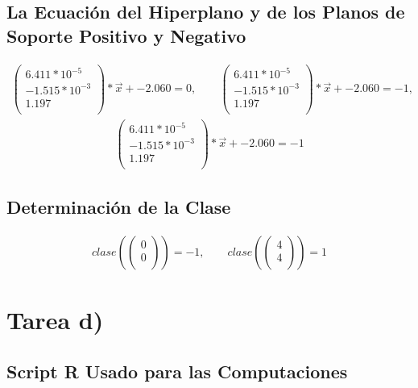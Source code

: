 \documentclass[fleqn]{llncs}
\begin{document}
\subsection{La Ecuación del Hiperplano y de los Planos de Soporte Positivo y Negativo}
\begin{align*}
	\begin{pmatrix}
		6.411*10^{-5} \\
		-1.515*10^{-3} \\
		1.197 \\
	\end{pmatrix} * \overrightarrow{x} + -2.060 = 0,
	\qquad
	\begin{pmatrix}
		6.411*10^{-5} \\
		-1.515*10^{-3} \\
		1.197 \\
	\end{pmatrix} * \overrightarrow{x} + -2.060 = -1,
\end{align*}
\begin{align*}
	\begin{pmatrix}
		6.411*10^{-5} \\
		-1.515*10^{-3} \\
		1.197 \\
	\end{pmatrix} * \overrightarrow{x} + -2.060 = -1
\end{align*}

\subsection{Determinación de la Clase}
\begin{align*}
	clase \left(
	\begin{pmatrix}
		0 \\
		0 \\
	\end{pmatrix} \right) = -1,
	\qquad
	clase \left(
	\begin{pmatrix}
		4 \\
		4 \\
	\end{pmatrix} \right) = 1
\end{align*}


\newpage


\section{Tarea d)}

\subsection{Script R Usado para las Computaciones}

\end{document}
